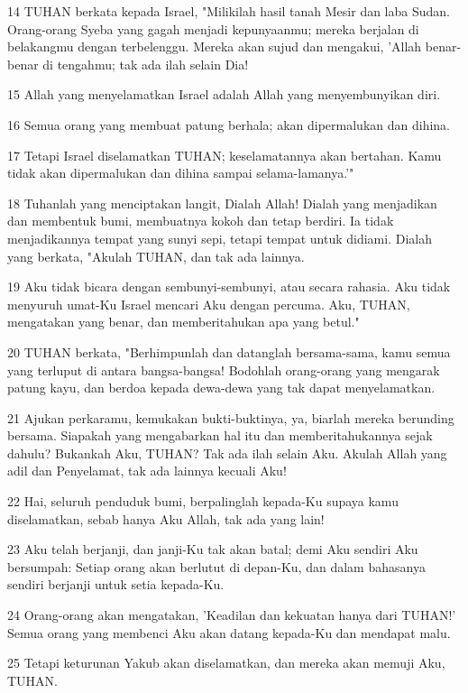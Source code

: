 \par 14 TUHAN berkata kepada Israel, "Milikilah hasil tanah Mesir dan laba Sudan. Orang-orang Syeba yang gagah menjadi kepunyaanmu; mereka berjalan di belakangmu dengan terbelenggu. Mereka akan sujud dan mengakui, 'Allah benar-benar di tengahmu; tak ada ilah selain Dia!
\par 15 Allah yang menyelamatkan Israel adalah Allah yang menyembunyikan diri.
\par 16 Semua orang yang membuat patung berhala; akan dipermalukan dan dihina.
\par 17 Tetapi Israel diselamatkan TUHAN; keselamatannya akan bertahan. Kamu tidak akan dipermalukan dan dihina sampai selama-lamanya.'"
\par 18 Tuhanlah yang menciptakan langit, Dialah Allah! Dialah yang menjadikan dan membentuk bumi, membuatnya kokoh dan tetap berdiri. Ia tidak menjadikannya tempat yang sunyi sepi, tetapi tempat untuk didiami. Dialah yang berkata, "Akulah TUHAN, dan tak ada lainnya.
\par 19 Aku tidak bicara dengan sembunyi-sembunyi, atau secara rahasia. Aku tidak menyuruh umat-Ku Israel mencari Aku dengan percuma. Aku, TUHAN, mengatakan yang benar, dan memberitahukan apa yang betul."
\par 20 TUHAN berkata, "Berhimpunlah dan datanglah bersama-sama, kamu semua yang terluput di antara bangsa-bangsa! Bodohlah orang-orang yang mengarak patung kayu, dan berdoa kepada dewa-dewa yang tak dapat menyelamatkan.
\par 21 Ajukan perkaramu, kemukakan bukti-buktinya, ya, biarlah mereka berunding bersama. Siapakah yang mengabarkan hal itu dan memberitahukannya sejak dahulu? Bukankah Aku, TUHAN? Tak ada ilah selain Aku. Akulah Allah yang adil dan Penyelamat, tak ada lainnya kecuali Aku!
\par 22 Hai, seluruh penduduk bumi, berpalinglah kepada-Ku supaya kamu diselamatkan, sebab hanya Aku Allah, tak ada yang lain!
\par 23 Aku telah berjanji, dan janji-Ku tak akan batal; demi Aku sendiri Aku bersumpah: Setiap orang akan berlutut di depan-Ku, dan dalam bahasanya sendiri berjanji untuk setia kepada-Ku.
\par 24 Orang-orang akan mengatakan, 'Keadilan dan kekuatan hanya dari TUHAN!' Semua orang yang membenci Aku akan datang kepada-Ku dan mendapat malu.
\par 25 Tetapi keturunan Yakub akan diselamatkan, dan mereka akan memuji Aku, TUHAN.

